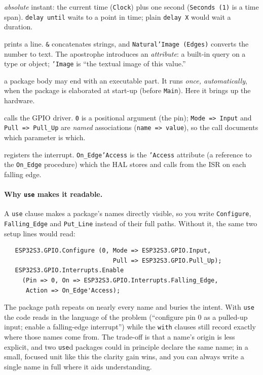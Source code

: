 \begin{description}[style=nextline]
  \emph{absolute} instant: the current time (\texttt{Clock}) plus one second
  (\texttt{Seconds (1)} is a time span). \texttt{delay until} waits to a point in
  time; plain \texttt{delay X} would wait a duration.
\item[\texttt{Put\_Line ("\ldots" \& Natural'Image (Edges));}] prints a line.
  \texttt{\&} concatenates strings, and \texttt{Natural'Image (Edges)} converts
  the number to text. The apostrophe introduces an \emph{attribute}: a built-in
  query on a type or object; \texttt{'Image} is ``the textual image of this
  value.''
\item[\texttt{begin \ldots\ end Edge\_Demo;}] a package body may end with an
  executable part. It runs \emph{once, automatically}, when the package is
  elaborated at start-up (before \texttt{Main}). Here it brings up the hardware.
\item[\texttt{Configure (0, Mode => Input, Pull => Pull\_Up);}] calls the GPIO
  driver. \texttt{0} is a positional argument (the pin); \texttt{Mode => Input}
  and \texttt{Pull => Pull\_Up} are \emph{named} associations
  (\texttt{name => value}), so the call documents which parameter is which.
\item[\texttt{Enable (\ldots, Action => On\_Edge'Access);}] registers the
  interrupt. \texttt{On\_Edge'Access} is the \texttt{'Access} attribute (a
  reference to the \texttt{On\_Edge} procedure) which the HAL stores and calls
  from the ISR on each falling edge.
\end{description}

\paragraph{Why \texttt{use} makes it readable.} A \texttt{use} clause makes a
package's names directly visible, so you write \texttt{Configure},
\texttt{Falling\_Edge} and \texttt{Put\_Line} instead of their full paths. Without
it, the same two setup lines would read:

\begin{lstlisting}
   ESP32S3.GPIO.Configure (0, Mode => ESP32S3.GPIO.Input,
                              Pull => ESP32S3.GPIO.Pull_Up);
   ESP32S3.GPIO.Interrupts.Enable
     (Pin => 0, On => ESP32S3.GPIO.Interrupts.Falling_Edge,
      Action => On_Edge'Access);
\end{lstlisting}

The package path repeats on nearly every name and buries the intent. With
\texttt{use} the code reads in the language of the problem (``configure pin 0
as a pulled-up input; enable a falling-edge interrupt'') while the \texttt{with}
clauses still record exactly where those names come from. The trade-off is that a
name's origin is less explicit, and two \texttt{use}d packages could in principle
declare the same name; in a small, focused unit like this the clarity gain wins,
and you can always write a single name in full where it aids understanding.

